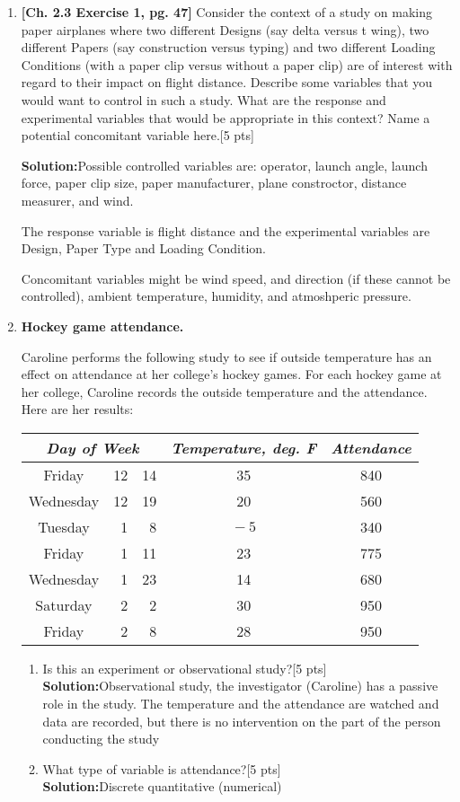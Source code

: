 \documentclass[11pt]{article}\usepackage[]{graphicx}\usepackage[]{color}
\begin{document}
\begin{enumerate}
\begin{enumerate}
    \end{enumerate}
    
\item \textbf{[Ch. 2.3 Exercise 1, pg. 47]} Consider the context of a study on making paper airplanes where two different Designs (say delta versus t wing), two different Papers (say construction versus typing) and two different Loading Conditions (with a paper clip versus without a paper clip) are of interest with regard to their impact on flight distance. Describe some variables that you would want to control in such a study. What are the response and experimental variables that would be appropriate in this context? Name a potential concomitant variable here.[5 pts]

\textbf{Solution:}Possible controlled variables are: operator, launch angle, launch force, paper clip size, paper manufacturer, plane constroctor, distance measurer, and wind. 

The response variable is flight distance and the experimental variables are Design, Paper Type and Loading Condition.

Concomitant variables might be wind speed, and direction (if these cannot be controlled), ambient temperature, humidity, and atmoshperic pressure. 


\item\textbf{Hockey game attendance.}

Caroline performs the following study to see if outside temperature
has an effect on attendance at her college's hockey games. For each
hockey game at her college, Caroline records the outside temperature and the attendance. Here are her results:

\hspace{1in}
\begin{tabular}{|cr@{/}r|c|c|} \hline
\multicolumn{3}{|c|}{\emph{Day of Week}} & \emph{Temperature, deg. F} & \emph{Attendance} \\ \hline
Friday & 12&14 & 35 & 840 \\
Wednesday & 12&19 & 20 & 560 \\
Tuesday & 1&8 & $\!-5$ & 340 \\
Friday & 1&11 & 23 & 775 \\
Wednesday & 1&23 & 14 & 680 \\
Saturday & 2&2 & 30 & 950 \\
Friday & 2&8 & 28 & 950 \\
\hline
\end{tabular}
 
    \begin{enumerate} 
    \item Is this an experiment or observational study?[5 pts]\\
    \textbf{Solution:}Observational study, the investigator (Caroline) has a passive role in the study. The temperature and the attendance are  watched and data are recorded, but there is no intervention on the part of the person conducting the study
    \item What type of variable is attendance?[5 pts]\\
    \textbf{Solution:}Discrete quantitative (numerical)
    

\end{enumerate}
\end{enumerate}
\end{document}

